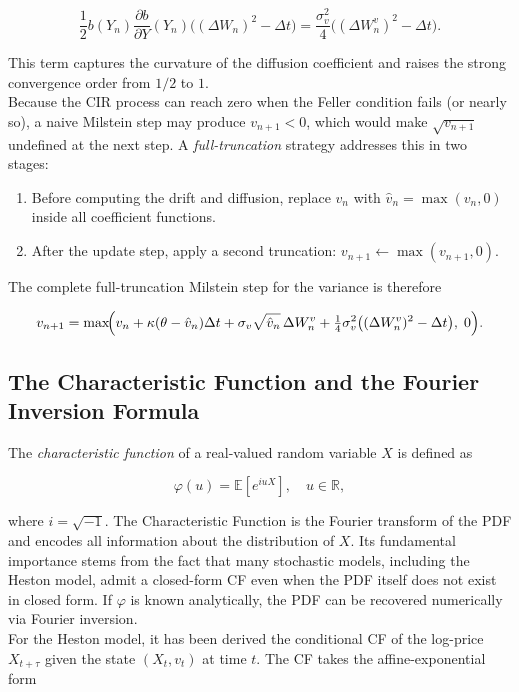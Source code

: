 \begin{equation}
    \frac{1}{2}b(Y_n)\frac{\partial b}{\partial Y}(Y_n)\bigl((\Delta W_n)^2 - \Delta t\bigr) = \frac{\sigma_v^2}{4}\bigl((\Delta W_n^v)^2 - \Delta t\bigr).
    \label{eq:milstein_correction}
\end{equation}

This term captures the curvature of the diffusion coefficient and raises the strong convergence order from $1/2$ to $1$.\\

Because the CIR process can reach zero when the Feller condition fails (or nearly so), a naive Milstein step may produce $v_{n+1} < 0$, which would make $\sqrt{v_{n+1}}$ undefined at the next step. A \textit{full-truncation} strategy addresses this in two stages:

\begin{enumerate}
    \item Before computing the drift and diffusion, replace $v_n$ with $\hat{v}_n = \max(v_n, 0)$ inside all coefficient functions.
    \item After the update step, apply a second truncation: $v_{n+1} \leftarrow \max(v_{n+1}, 0)$.
\end{enumerate}

The complete full-truncation Milstein step for the variance is therefore

\begin{equation}
    v_{n+1} = \max\!\Bigl(v_n + \kappa(\theta - \hat{v}_n)\Delta t + \sigma_v\sqrt{\hat{v}_n}\,\Delta W_n^v + \tfrac{1}{4}\sigma_v^2\bigl((\Delta W_n^v)^2 - \Delta t\bigr),\; 0\Bigr).
    \label{eq:milstein_full_trajectory}
\end{equation}


\subsection{The Characteristic Function and the Fourier Inversion Formula}

The \textit{characteristic function} of a real-valued random variable $X$ is defined as

\begin{equation}
    \varphi(u) = \mathbb{E}\!\left[e^{iuX}\right], \quad u \in \mathbb{R},
    \label{eq:cf_def}
\end{equation}

where $i = \sqrt{-1}$. The Characteristic Function is the Fourier transform of the PDF and encodes all information about the distribution
 of $X$. Its fundamental importance stems from the fact that many stochastic models, including the Heston model, 
 admit a closed-form CF even when the PDF itself does not exist in closed form. If $\varphi$ is known analytically, the PDF can be recovered numerically via Fourier inversion.\\
For the Heston model, \cite{heston:heston_paper} it has been derived the conditional CF of the log-price $X_{t+\tau}$ given the state $(X_t, v_t)$ at time $t$.
The CF takes the affine-exponential form

